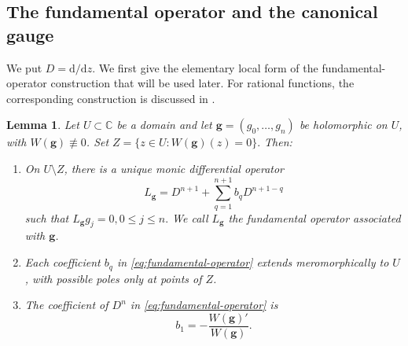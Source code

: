 \documentclass[12pt,letterpaper,reqno]{amsart}
\newtheorem{lem}[thm]{Lemma}
\theoremstyle{definition}
\numberwithin{equation}{section}
\newcommand{\C}{\mathbb C}
\newcommand{\gv}{\bm g}
\begin{document}
\subsection{The fundamental operator and the canonical gauge}


We put \(D=\mathrm d/\mathrm dz\). We first give the elementary local form of the fundamental-operator construction that will be used later. For rational functions, the corresponding construction is discussed in
\cite[Section~2, Proposition~2.2]{Pur23}.

\begin{lem}\label{lem:fundamental-operator}
Let \(U\subset\C\) be a domain and let
\(\gv=(g_0,\ldots,g_{n})\) be holomorphic on \(U\), with
\(W(\gv)\not\equiv0\). Set
$
Z=\{z\in U:W(\gv)(z)=0\}.
$
Then:
\begin{enumerate}[label=\textup{(\roman*)}]
\item On \(U\setminus Z\), there is a unique monic differential operator
\begin{equation}\label{eq:fundamental-operator}
L_{\gv}=D^{n+1}+\sum_{q=1}^{n+1}b_qD^{n+1-q}
\end{equation}
such that
$
L_{\gv}g_j=0, 0\le j\le n.
$ We call \(L_{\gv}\) the \emph{fundamental operator associated with
\(\gv\)}. 
\item Each coefficient \(b_q\) in \eqref{eq:fundamental-operator} extends meromorphically to \(U\), with possible
poles only at points of \(Z\).

\item The coefficient of \(D^{n}\)  in \eqref{eq:fundamental-operator}  is
$$
b_1=-\frac{W(\gv)'}{W(\gv)}.
$$
\end{enumerate}
\end{lem}
\end{document}
